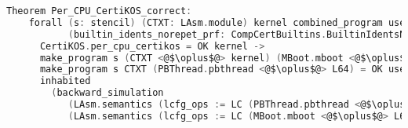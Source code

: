 \begin{lstlisting}[language=C]
  Theorem Per_CPU_CertiKOS_correct:
    forall (s: stencil) (CTXT: LAsm.module) kernel combined_program user_program
           (builtin_idents_norepet_prf: CompCertBuiltins.BuiltinIdentsNorepet),
      CertiKOS.per_cpu_certikos = OK kernel ->
      make_program s (CTXT <@$\oplus$@> kernel) (MBoot.mboot <@$\oplus$@> L64) = OK combined_program ->
      make_program s CTXT (PBThread.pbthread <@$\oplus$@> L64) = OK user_program ->
      inhabited
        (backward_simulation
           (LAsm.semantics (lcfg_ops := LC (PBThread.pbthread <@$\oplus$@> L64)) user_program)
           (LAsm.semantics (lcfg_ops := LC (MBoot.mboot <@$\oplus$@> L64)) combined_program)).
\end{lstlisting}
